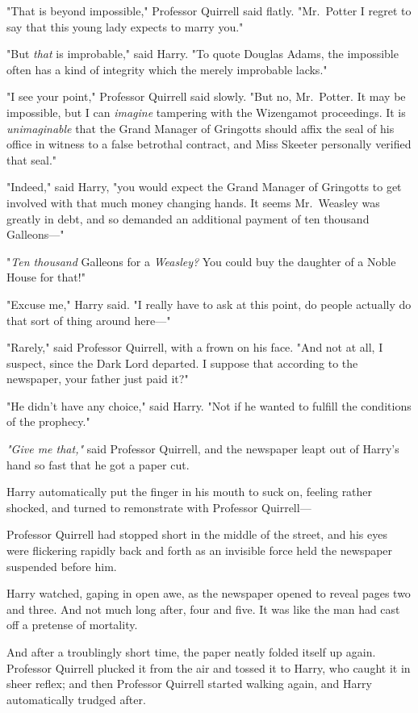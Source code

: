 "That is beyond impossible," Professor Quirrell said flatly.
"Mr.~Potter{\el} I regret to say that this young lady expects to marry you."

"But \emph{that} is improbable," said Harry. "To quote Douglas Adams, the
impossible often has a kind of integrity which the merely improbable lacks."

"I see your point," Professor Quirrell said slowly. "But{\el} no,
Mr.~Potter. It may be impossible, but I can \emph{imagine} tampering with the
Wizengamot proceedings. It is \emph{unimaginable} that the Grand Manager of
Gringotts should affix the seal of his office in witness to a false betrothal
contract, and Miss Skeeter personally verified that seal."

"Indeed," said Harry, "you would expect the Grand Manager of Gringotts to get
involved with that much money changing hands. It seems Mr.~Weasley was greatly
in debt, and so demanded an additional payment of ten thousand Galleons\mbox{---}"

"\emph{Ten thousand} Galleons for a \emph{Weasley?} You could buy the daughter
of a Noble House for that!"

"Excuse me," Harry said. "I really have to ask at this point, do people
actually do that sort of thing around here\mbox{---}"

"Rarely," said Professor Quirrell, with a frown on his face. "And not at all, I
suspect, since the Dark Lord departed. I suppose that according to the
newspaper, your father just paid it?"

"He didn't have any choice," said Harry. "Not if he wanted to fulfill the
conditions of the prophecy."

\emph{"Give me that,"} said Professor Quirrell, and the newspaper leapt out of
Harry's hand so fast that he got a paper cut.

Harry automatically put the finger in his mouth to suck on, feeling rather
shocked, and turned to remonstrate with Professor Quirrell\mbox{---}

Professor Quirrell had stopped short in the middle of the street, and his eyes
were flickering rapidly back and forth as an invisible force held the newspaper
suspended before him.

Harry watched, gaping in open awe, as the newspaper opened to reveal pages two
and three. And not much long after, four and five. It was like the man had cast
off a pretense of mortality.

And after a troublingly short time, the paper neatly folded itself up again.
Professor Quirrell plucked it from the air and tossed it to Harry, who caught
it in sheer reflex; and then Professor Quirrell started walking again, and
Harry automatically trudged after.

